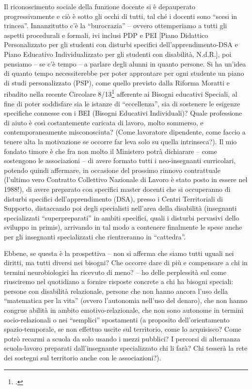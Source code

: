 Il riconoscimento sociale della funzione docente si è depauperato progressivamente e ciò è sotto gli occhi di tutti, tal ché i docenti sono “scesi in trincea”. Innanzitutto c'è la “burocrazia” – ovvero ottemperiamo a tutti gli aspetti procedurali e formali, ivi inclusi PDP e PEI [Piano Didattico Personalizzato per gli studenti con disturbi specifici dell'apprendimento-DSA e Piano Educativo Individualizzato per gli studenti con disabilità, N.d.R.], poi pensiamo – se c'è tempo – a parlare degli alunni in quanto persone. Si ha un'idea di quanto tempo necessiterebbe per poter approntare per ogni studente un piano di studi personalizzato (PSP), come quello previsto dalla Riforma Moratti e ribadito nella recente Circolare 8/13\footcite{cm8_2013} afferente ai Bisogni educativi Speciali, al fine di poter soddisfare sia le istanze di “eccellenza”, sia di sostenere le esigenze specifiche connesse con i BEI (Bisogni Educativi Individuali)? Quale professione di aiuto è così costantemente caricata di lavoro, molto sommerso, e contemporaneamente misconosciuta? (Come lavoratore dipendente, come faccio a tenere alta la motivazione se occorre far leva solo su quella intrinseca?).
Il mio fondato timore è che fra non molto il Ministero potrà dichiarare – come sostengono le associazioni – di avere formato tutti i neo-insegnanti curricolari, potendo quindi affermare, in occasione del prossimo rinnovo contrattuale (l'ultimo vero Contratto Collettivo Nazionale di Lavoro è stato posto in essere nel 1988!), di avere preparato con specifici master docenti che si occuperanno di disturbi specifici dell'apprendimento (DSA), presso i Centri Territoriali di Supporto, distaccando poi degli specialisti nell'area della disabilità (insegnanti specializzati “superpreparati” in ambiti specifici, quali i disturbi pervasivi dello sviluppo in primis), arrivando in tal modo a contenere finalmente le spese anche per gli insegnanti specializzati che rientreranno in “cattedra”.

Ebbene, se questa è la prospettiva – non si afferma che siamo tutti uguali nei diritti, ma tutti diversi nei bisogni? Che occorre dare di più e compensare a chi in termini neurobiologici ha ricevuto di meno? – ho delle perplessità sul come riusciremo nel quotidiano a fornire risposte concrete a chi ha bisogni speciali: persone con disabilità relazionale, persone che non hanno ancora l'uso della “matematica per la vita” (ovvero l'autonomia nell'uso del denaro), che non hanno congrue abilità in ambito emotivo-relazionale, che non sono autonome in termini socio-relazionali o nei “semplici” spostamenti (a proposito dell'orientamento spazio-temporale, se non effettuo uscite sul territorio, come lo acquisisco? Come potrò recarmi a scuola da solo usando i mezzi pubblici? I percorsi di alternanza scuola-lavoro preparati dall'insegnante specializzato chi li farà? Chi tesserà la rete dei sostegni sul territorio anche con le associazioni?).

